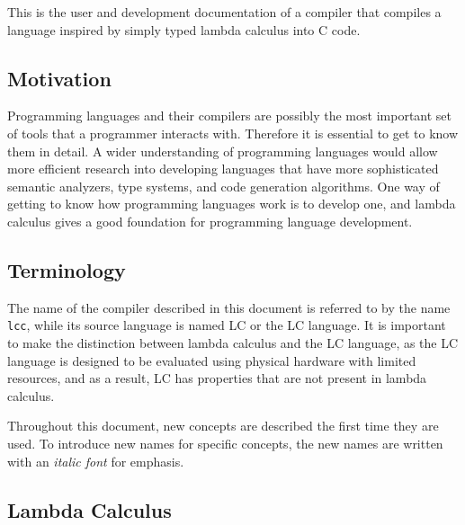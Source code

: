 \documentclass[12pt]{article}
\begin{document}
This is the user and development documentation of a compiler that compiles a
language inspired by simply typed lambda calculus into C code.

\subsection{Motivation}

Programming languages and their compilers are possibly the most important set of
tools that a programmer interacts with. Therefore it is essential to get to know
them in detail. A wider understanding of programming languages would allow more
efficient research into developing languages that have more sophisticated
semantic analyzers, type systems, and code generation algorithms. One way of
getting to know how programming languages work is to develop one, and lambda
calculus gives a good foundation for programming language development.

\subsection{Terminology}

The name of the compiler described in this document is referred to by the name
\verb$lcc$, while its source language is named LC or the LC language. It is
important to make the distinction between lambda calculus and the LC language,
as the LC language is designed to be evaluated using physical hardware with
limited resources, and as a result, LC has properties that are not present in
lambda calculus.

Throughout this document, new concepts are described the first time they are
used. To introduce new names for specific concepts, the new names are written
with an \emph{italic font} for emphasis.

\subsection{Lambda Calculus}
\end{document}
